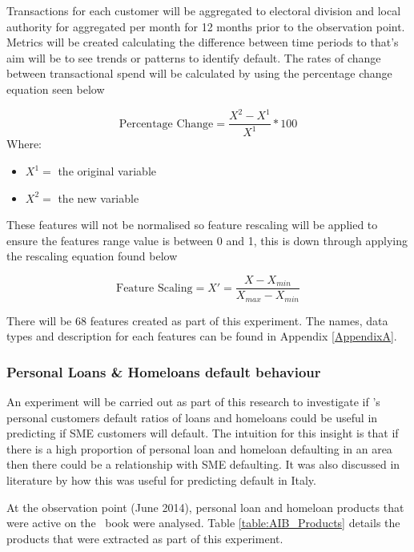 Transactions for each customer will be aggregated to electoral division and local authority for aggregated per month for 12 months prior to the observation point. Metrics will be created calculating the difference between time periods to that's aim will be to see trends or patterns to identify default. The rates of change between transactional spend will be calculated by using the percentage change equation seen below

\begin{equation} \label{eqn:PercentageChange}
\text{Percentage Change} = \frac{X^{2} - X^{1}}{X^{1}}*100  
\end{equation}
Where: 
\vspace{-7mm} 
\begin{itemize}
	\item $X^{1} = $ the original variable
	\item $X^{2} = $ the new variable
\end{itemize}

These features will not be normalised so feature rescaling will be applied to ensure the features range value is between 0 and 1, this is down through applying the rescaling equation found below  

\begin{equation}\label{eqn:rescaling}
\text{Feature Scaling} =  X' = \frac{X - X_{min}}{X_{max} - X_{min}}
\end{equation}

There will be 68 features created as part of this experiment. The names, data types and description for each features can be found in Appendix \ref{AppendixA}.



\subsubsection{Personal Loans \& Homeloans default behaviour}
An experiment will be carried out as part of this research to investigate if \subjectname's personal customers default ratios of loans and homeloans could be useful in predicting if SME customers will default. The intuition for this insight is that if there is a high proportion of personal loan and homeloan defaulting in an area then there could be a relationship with SME defaulting. It was also discussed in literature by \cite{di_pietro_regional} how this was useful for predicting default in Italy.

At the observation point (June 2014), personal loan and homeloan products that were active on the \subjectname\ book were analysed. Table \ref{table:AIB_Products} details the products that were extracted as part of this experiment.

